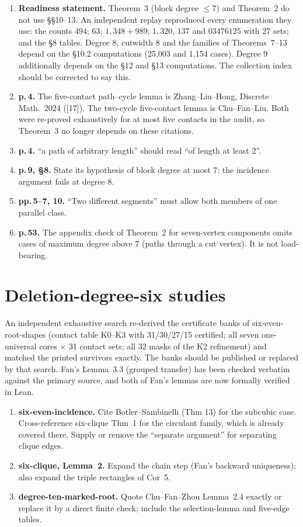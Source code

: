 \documentclass[11pt]{amsart}
\begin{document}
\begin{enumerate}
\item \textbf{Readiness statement.} Theorem~3 (block degree $\le7$) and Theorem~2 do not use
\S\S10--13. An independent replay reproduced every enumeration they use: the counts $494$; $63$; $1{,}348+989$;
$1{,}320$, $137$ and $03476125$ with $27$ sets; and the \S8 tables. Degree $8$, cutwidth $8$ and the
families of Theorems~7--13 depend on the \S10.2 computations (25{,}003 and 1{,}154 cases). Degree $9$
additionally depends on the \S12 and \S13 computations. The collection index should be corrected to say
this.
\item \textbf{p.\,4.} The five-contact path--cycle lemma is Zhang--Liu--Hong, Discrete Math.\ 2024
([17]). The two-cycle five-contact lemma is Chu--Fan--Liu. Both were re-proved exhaustively for at most
five contacts in the audit, so Theorem~3 no longer depends on these citations.
\item \textbf{p.\,4.} ``a path of arbitrary length'' should read ``of length at least $2$''.
\item \textbf{p.\,9, \S8.} State its hypothesis of block degree at most $7$; the incidence argument fails
at degree $8$.
\item \textbf{pp.\,5--7, 10.} ``Two different segments'' must allow both members of one parallel class.
\item \textbf{p.\,53.} The appendix check of Theorem~2 for seven-vertex components omits cases of maximum
degree above $7$ (paths through a cut vertex). It is not load-bearing.
\end{enumerate}

\section{Deletion-degree-six studies}

An independent exhaustive search re-derived the certificate banks of six-even-root-shapes (contact table
K0--K3 with 31/30/27/15 certified; all seven one-universal cores $\times$ 31 contact sets; all 32 masks of
the K2 refinement) and matched the printed survivors exactly. The banks should be published or replaced
by that search. Fan's Lemma~3.3 (grouped transfer) has been checked verbatim against the primary source,
and both of Fan's lemmas are now formally verified in Lean.

\begin{enumerate}
\item \textbf{six-even-incidence.} Cite Botler--Sambinelli (Thm 13) for the subcubic case. Cross-reference
six-clique Thm~1 for the circulant family, which is already covered there. Supply or remove the
``separate argument'' for separating clique edges.
\item \textbf{six-clique, Lemma~2.} Expand the chain step (Fan's backward uniqueness); also expand the
triple rectangles of Cor~5.
\item \textbf{degree-ten-marked-root.} Quote Chu--Fan--Zhou Lemma~2.4 exactly or replace it by a direct
finite check; include the selection-lemma and five-edge tables.
\end{enumerate}
\end{document}
